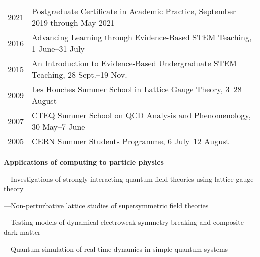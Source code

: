 \documentclass[10 pt]{article}
\renewcommand{\section}[2]%
    {\pagebreak[2]\vspace{1.3\baselineskip}%
     \hspace{0in}%
     \marginpar{
     \raggedright \scshape #1}#2}
\newenvironment{tightlist}
  {\begin{list} {} {\setlength{\topsep}{-8 pt} \setlength{\itemsep}{-3 pt} \setlength{\leftmargin}{0 mm}}}{\end{list}}
\begin{document}
\vspace{-12 pt} %
\begin{tabular}[t]{cl}
  2021 & Postgraduate Certificate in Academic Practice, September 2019 through May 2021   \\ %
  2016 & Advancing Learning through Evidence-Based STEM Teaching, 1 June--31 July         \\ %
  2015 & An Introduction to Evidence-Based Undergraduate STEM Teaching, 28 Sept.--19 Nov. \\ %
  2009 & Les Houches Summer School in Lattice Gauge Theory, 3--28 August                  \\ %
  2007 & CTEQ Summer School on QCD Analysis and Phenomenology, 30 May--7 June             \\ %
  2005 & CERN Summer Students Programme, 6 July--12 August                                \\ %
\end{tabular}

\newpage



\section{Research} %

\vspace{-12 pt} %
\begin{tightlist}
  \item \textbf{Applications of computing to particle physics}
  \item ---Investigations of strongly interacting quantum field theories using lattice gauge theory
  \item ---Non-perturbative lattice studies of supersymmetric field theories
  \item ---Testing models of dynamical electroweak symmetry breaking and composite dark matter
  \item ---Quantum simulation of real-time dynamics in simple quantum systems
\end{tightlist}
\end{document}
